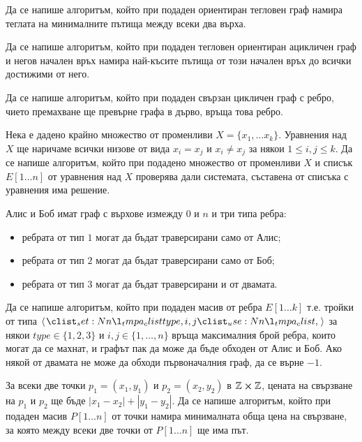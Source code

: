 \begin{problem}
Да се напише алгоритъм, който при подаден ориентиран тегловен граф намира теглата на минималните пътища между всеки два върха.
\end{problem}

\begin{problem}
Да се напише алгоритъм, който при подаден тегловен ориентиран ацикличен граф и негов начален връх намира най-късите пътища от този начален връх до всички достижими от него.
\end{problem}

\begin{problem}
Да се напише алгоритъм, който при подаден свързан цикличен граф с ребро, чието премахване ще превърне графа в дърво, връща това ребро.
\end{problem}

\begin{problem}
Нека е дадено крайно множество от променливи $X = \{ x_1, \dots x_k \}$.
Уравнения над $X$ ще наричаме всички низове от вида $x_i = x_j$ и $x_i \neq x_j$ за някои $1 \leq i, j \leq k$.
Да се напише алгоритъм, който при подадено множество от променливи $X$ и списък $E[1 \dots n]$ от уравнения над $X$ проверява дали системата, съставена от списъка с уравнения има решение.
\end{problem}

\newpage

\begin{problem}
Алис и Боб имат граф с върхове измежду $0$ и $n$ и три типа ребра:
\begin{itemize}
  \item ребрата от тип $1$ могат да бъдат траверсирани само от Алис;
  \item ребрата от тип $2$ могат да бъдат траверсирани само от Боб;
  \item ребрата от тип $3$ могат да бъдат траверсирани и от двамата.
\end{itemize}
Да се напише алгоритъм, който при подаден масив от ребра $E[1 \dots k]$ т.е. тройки от типа $\opair{type, i, j}$ за някои $type \in \{1, 2, 3\}$ и $i, j \in \{ 1, \dots, n \}$ връща максималния брой ребра, които могат да се махнат, и графът пак да може да бъде обходен от Алис и Боб.
Ако някой от двамата не може да обходи първоначалния граф, да се върне $-1$.
\end{problem}

\begin{problem}
За всеки две точки $p_1 =(x_1, y_1)$ и $p_2 = (x_2, y_2)$ в $\mathbb{Z} \cross \mathbb{Z}$, цената на свързване на $p_1$ и $p_2$ ще бъде $|x_1 - x_2| + |y_1 - y_2|$.
Да се напише алгоритъм, който при подаден масив $P[1 \dots n]$ от точки намира минималната обща цена на свързване, за която между всеки две точки от $P[1 \dots n]$ ще има път.
\end{problem}